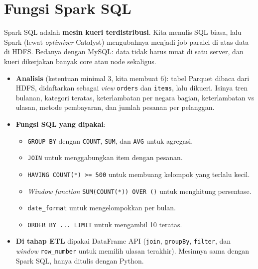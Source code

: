 \documentclass[11pt,a4paper]{article}
\newcommand{\f}[1]{\texttt{#1}}
\begin{document}
\section{Fungsi Spark SQL}
Spark SQL adalah \textbf{mesin kueri terdistribusi}. Kita menulis SQL biasa, lalu Spark
(lewat \emph{optimizer} Catalyst) mengubahnya menjadi job paralel di atas data di HDFS.
Bedanya dengan MySQL: data tidak harus muat di satu server, dan kueri dikerjakan banyak
core atau node sekaligus.
\begin{itemize}
\item \textbf{Analisis} (ketentuan minimal 3, kita membuat 6): tabel Parquet dibaca dari
  HDFS, didaftarkan sebagai \emph{view} \f{orders} dan \f{items}, lalu dikueri. Isinya
  tren bulanan, kategori teratas, keterlambatan per negara bagian, keterlambatan vs
  ulasan, metode pembayaran, dan jumlah pesanan per pelanggan.
\item \textbf{Fungsi SQL yang dipakai}:
  \begin{itemize}
  \item \f{GROUP BY} dengan \f{COUNT}, \f{SUM}, dan \f{AVG} untuk agregasi.
  \item \f{JOIN} untuk menggabungkan item dengan pesanan.
  \item \f{HAVING COUNT(*) >= 500} untuk membuang kelompok yang terlalu kecil.
  \item \emph{Window function} \f{SUM(COUNT(*)) OVER ()} untuk menghitung persentase.
  \item \f{date\_format} untuk mengelompokkan per bulan.
  \item \f{ORDER BY ... LIMIT} untuk mengambil 10 teratas.
  \end{itemize}
\item \textbf{Di tahap ETL} dipakai DataFrame API (\f{join}, \f{groupBy}, \f{filter},
  dan \emph{window} \f{row\_number} untuk memilih ulasan terakhir). Mesinnya sama dengan
  Spark SQL, hanya ditulis dengan Python.
\end{itemize}

\end{document}
